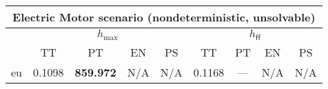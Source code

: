 \documentclass[landscape]{article}%
\begin{document}
%
\normalsize%
\begin{tabular}{||c||c|c|c|c|c|c|c|c||}%
\multicolumn{9}{c}{\textbf{Electric Motor scenario (nondeterministic, unsolvable)}}\\%
\hline%
&\multicolumn{4}{||c||}{$h_{\max}$}&\multicolumn{4}{||c||}{$h_{\mathsf{ff}}$}\\%
\hline%
&\small{TT}&\small{PT}&\small{EN}&\small{PS}&\small{TT}&\small{PT}&\small{EN}&\small{PS}\\%
\hline%
\hline%
eu&\small{0.1098}&\small{\textbf{859.972}}&\small{N/A}&\small{N/A}&\small{0.1168}&\small{---}&\small{N/A}&\small{N/A}\\%
\hline%
\end{tabular}%
\end{document}
